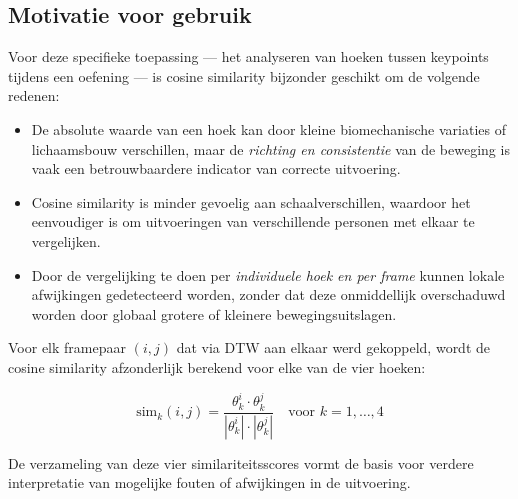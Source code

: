 \subsection{Motivatie voor gebruik}

Voor deze specifieke toepassing — het analyseren van hoeken tussen keypoints tijdens een oefening — is cosine similarity bijzonder geschikt om de volgende redenen:

\begin{itemize}
    \item De absolute waarde van een hoek kan door kleine biomechanische variaties of lichaamsbouw verschillen, maar de \textit{richting en consistentie} van de beweging is vaak een betrouwbaardere indicator van correcte uitvoering.
    \item Cosine similarity is minder gevoelig aan schaalverschillen, waardoor het eenvoudiger is om uitvoeringen van verschillende personen met elkaar te vergelijken.
    \item Door de vergelijking te doen per \textit{individuele hoek en per frame} kunnen lokale afwijkingen gedetecteerd worden, zonder dat deze onmiddellijk overschaduwd worden door globaal grotere of kleinere bewegingsuitslagen.
\end{itemize}

Voor elk framepaar $(i, j)$ dat via DTW aan elkaar werd gekoppeld, wordt de cosine similarity afzonderlijk berekend voor elke van de vier hoeken:

\[
\text{sim}_k(i,j) = \frac{\theta_k^i \cdot \theta_k^j}{|\theta_k^i| \cdot |\theta_k^j|} \quad \text{voor } k = 1,\dots,4
\]

De verzameling van deze vier similariteitsscores vormt de basis voor verdere interpretatie van mogelijke fouten of afwijkingen in de uitvoering.